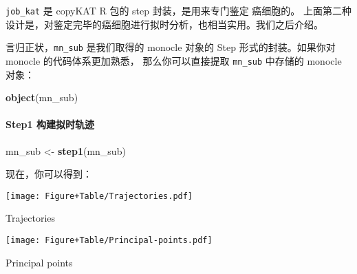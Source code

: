 \documentclass[
]{article}
\newenvironment{Shaded}{\begin{snugshade}}{\end{snugshade}}
\newcommand{\KeywordTok}[1]{\textcolor[rgb]{0.13,0.29,0.53}{\textbf{#1}}}
\newcommand{\NormalTok}[1]{#1}
\newcommand{\OperatorTok}[1]{\textcolor[rgb]{0.81,0.36,0.00}{\textbf{#1}}}
\newcommand{\StringTok}[1]{\textcolor[rgb]{0.31,0.60,0.02}{#1}}
\begin{document}
\texttt{job\_kat} 是 copyKAT R 包的 step 封装，是用来专门鉴定 癌细胞的。
上面第二种设计是，对鉴定完毕的癌细胞进行拟时分析，也相当实用。我们之后介绍。

言归正状，\texttt{mn\_sub} 是我们取得的 monocle 对象的 Step 形式的封装。如果你对 monocle 的代码体系更加熟悉，
那么你可以直接提取 \texttt{mn\_sub} 中存储的 monocle 对象：

\begin{Shaded}
\begin{Highlighting}[]
\KeywordTok{object}\NormalTok{(mn\_sub)}
\end{Highlighting}
\end{Shaded}

\hypertarget{step1-ux6784ux5efaux62dfux65f6ux8f68ux8ff9}{%
\paragraph{Step1 构建拟时轨迹}\label{step1-ux6784ux5efaux62dfux65f6ux8f68ux8ff9}}

\begin{Shaded}
\begin{Highlighting}[]
\NormalTok{mn\_sub \textless{}{-}}\StringTok{ }\KeywordTok{step1}\NormalTok{(mn\_sub)}
\end{Highlighting}
\end{Shaded}

现在，你可以得到：

\begin{Shaded}
\end{Shaded}

\def\@captype{figure}
\begin{center}
\texttt{[image: Figure+Table/Trajectories.pdf]}
\caption{Trajectories}\label{fig:Trajectories}
\end{center}

\def\@captype{figure}
\begin{center}
\texttt{[image: Figure+Table/Principal-points.pdf]}
\caption{Principal points}\label{fig:Principal-points}
\end{center}
\end{document}
